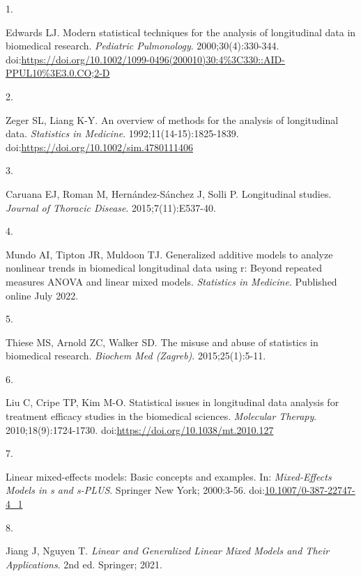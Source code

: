 \documentclass[
]{article}
\newlength{\cslhangindent}
\newlength{\csllabelwidth}
\newlength{\cslentryspacingunit} %
\newenvironment{CSLReferences}[2] %
 {%
  \setlength{\parindent}{0pt}
  \ifodd #1
  \let\oldpar\par
  \def\par{\hangindent=\cslhangindent\oldpar}
  \fi
  \setlength{\parskip}{#2\cslentryspacingunit}
 }%
 {}
\newcommand{\CSLLeftMargin}[1]{\parbox[t]{\csllabelwidth}{#1}}
\newcommand{\CSLRightInline}[1]{\parbox[t]{\linewidth - \csllabelwidth}{#1}\break}
\begin{document}
\begin{CSLReferences}{0}{0}
\leavevmode{}%
\CSLLeftMargin{1. }%
\CSLRightInline{Edwards LJ. Modern statistical techniques for the
analysis of longitudinal data in biomedical research. \emph{Pediatric
Pulmonology}. 2000;30(4):330-344.
doi:\url{https://doi.org/10.1002/1099-0496(200010)30:4\%3C330::AID-PPUL10\%3E3.0.CO;2-D}}

\leavevmode{}%
\CSLLeftMargin{2. }%
\CSLRightInline{Zeger SL, Liang K-Y. An overview of methods for the
analysis of longitudinal data. \emph{Statistics in Medicine}.
1992;11(14-15):1825-1839.
doi:\url{https://doi.org/10.1002/sim.4780111406}}

\leavevmode{}%
\CSLLeftMargin{3. }%
\CSLRightInline{Caruana EJ, Roman M, Hernández-Sánchez J, Solli P.
Longitudinal studies. \emph{Journal of Thoracic Disease}.
2015;7(11):E537-40.}

\leavevmode{}%
\CSLLeftMargin{4. }%
\CSLRightInline{Mundo AI, Tipton JR, Muldoon TJ. Generalized additive
models to analyze nonlinear trends in biomedical longitudinal data using
r: Beyond repeated measures {ANOVA} and linear mixed models.
\emph{Statistics in Medicine}. Published online July 2022.}

\leavevmode{}%
\CSLLeftMargin{5. }%
\CSLRightInline{Thiese MS, Arnold ZC, Walker SD. The misuse and abuse of
statistics in biomedical research. \emph{Biochem Med (Zagreb)}.
2015;25(1):5-11.}

\leavevmode{}%
\CSLLeftMargin{6. }%
\CSLRightInline{Liu C, Cripe TP, Kim M-O. Statistical issues in
longitudinal data analysis for treatment efficacy studies in the
biomedical sciences. \emph{Molecular Therapy}. 2010;18(9):1724-1730.
doi:\url{https://doi.org/10.1038/mt.2010.127}}

\leavevmode{}%
\CSLLeftMargin{7. }%
\CSLRightInline{Linear mixed-effects models: Basic concepts and
examples. In: \emph{Mixed-Effects Models in s and s-PLUS}. Springer New
York; 2000:3-56.
doi:\href{https://doi.org/10.1007/0-387-22747-4_1}{10.1007/0-387-22747-4\_1}}

\leavevmode{}%
\CSLLeftMargin{8. }%
\CSLRightInline{Jiang J, Nguyen T. \emph{Linear and Generalized Linear
Mixed Models and Their Applications}. 2nd ed. Springer; 2021.}


\end{CSLReferences}
\end{document}
